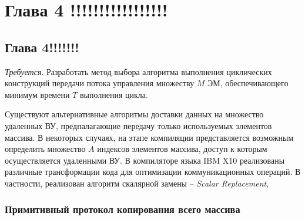 \chapter{Глава 4 !!!!!!!!!!!!!!!!!} \label{chapt4}

\section{Глава 4!!!!!!!}

\clearpage
\newpage



\textit{Требуется}. Разработать метод выбора алгоритма выполнения циклических
конструкций передачи потока управления множеству $M$ ЭМ, обеспечивающего минимум
времени $T$ выполнения цикла.


Существуют альтернативные алгоритмы доставки данных на множество удаленных ВУ,
предпалагающие передачу только используемых элементов массива. В некоторых
случаях, на этапе компиляции представляется возможным определить множество $A$
индексов элементов массива, доступ к которым осуществляется удаленными ВУ.
В компиляторе языка IBM X10 реализованы различные трансформации кода для
оптимизации коммуникационных операций. В частности, реализован алгоритм
скалярной замены -- \textit{Scalar Replacement}, 



\subsection{Примитивный протокол копирования всего массива}


